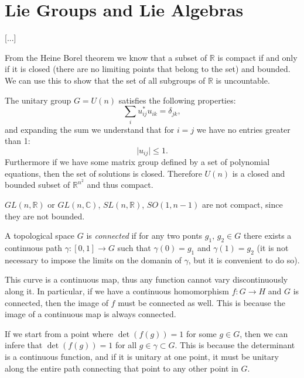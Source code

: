 \chapter{Lie Groups and Lie Algebras}

 [...]

From the Heine Borel theorem we know that a subset of $\mathbb{R}$ is compact if and only if it is closed (there are no limiting points that belong to the set) and bounded. We can use this to show that the set of all subgroups of $\mathbb{R}$ is uncountable.

\begin{example}
    The unitary group \(G = U(n)\) satisfies the following properties:
    \[
        \sum_{i} u^*_{ij} u_{ik} = \delta_{jk},
    \]
    and expanding the sum we understand that for \(i=j\) we have no entries greater than 1:
    \[
        \vert u_{ij} \vert \leq 1.
    \]
    Furthermore if we have some matrix group defined by a set of polynomial equations, then the set of solutions is closed. Therefore \(U(n)\) is a closed and bounded subset of \(\mathbb{R}^{n^2}\) and thus compact.
\end{example}

\begin{example}
    \(GL(n,\mathbb{R})\) or \(GL(n,\mathbb{C})\), \(SL(n,\mathbb{R})\), \(SO(1,n-1)\) are not compact, since they are not bounded.
\end{example}

\begin{definition}[Connectedness]
    A topological space \(G\) is \textit{connected} if for any two ponts \(g_1,\,g_2 \in G\) there exists a continuous path \(\gamma : [0,1] \to G\) such that \(\gamma(0) = g_1\) and \(\gamma(1) = g_2\) (it is not necessary to impose the limits on the domanin of \(\gamma\), but it is convenient to do so).
\end{definition}

This curve is a continuous map, thus any function cannot vary discontinuously along it. In particular, if we have a continuous homomorphism \(f : G \to H\) and \(G\) is connected, then the image of \(f\) must be connected as well. This is because the image of a continuous map is always connected.

If we start from a point where \(\det(f(g)) = 1\) for some \(g \in G\), then we can infere that \(\det(f(g)) = 1\) for all \(g \in \gamma \subset G\). This is because the determinant is a continuous function, and if it is unitary at one point, it must be unitary along the entire path connecting that point to any other point in \(G\).

